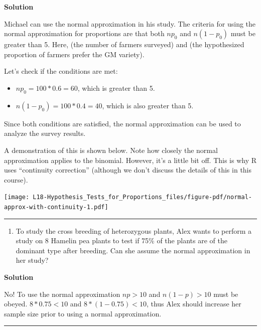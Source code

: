 \documentclass[
  letterpaper,
  DIV=11,
  numbers=noendperiod,
  oneside]{scrreprt}
\providecommand{\tightlist}{%
  \setlength{\itemsep}{0pt}\setlength{\parskip}{0pt}}\usepackage{longtable,booktabs,array}
\begin{document}
\textbf{Solution}

Michael can use the normal approximation in his study. The criteria for
using the normal approximation for proportions are that both \(np_0\)
and \(n(1 - p_0)\) must be greater than 5. Here, (the number of farmers
surveyed) and (the hypothesized proportion of farmers prefer the GM
variety).

Let's check if the conditions are met:

\begin{itemize}
\tightlist
\item
  \(np_0 = 100 * 0.6 = 60\), which is greater than 5.
\item
  \(n(1 - p_0) = 100 * 0.4 = 40\), which is also greater than 5.
\end{itemize}

Since both conditions are satisfied, the normal approximation can be
used to analyze the survey results.

A demonstration of this is shown below. Note how closely the normal
approximation applies to the binomial. However, it's a little bit off.
This is why R uses ``continuity correction'' (although we don't discuss
the details of this in this course).

\texttt{[image: L18-Hypothesis\_Tests\_for\_Proportions\_files/figure-pdf/normal-approx-with-continuity-1.pdf]}

\begin{center}\rule{0.5\linewidth}{0.5pt}\end{center}

\begin{enumerate}
\def\labelenumi{\arabic{enumi}.}
\setcounter{enumi}{1}
\tightlist
\item
  To study the cross breeding of heterozygous plants, Alex wants to
  perform a study on 8 Hamelin pea plants to test if 75\% of the plants
  are of the dominant type after breeding. Can she assume the normal
  approximation in her study?
\end{enumerate}

\textbf{Solution}

No! To use the normal approximation \(np \gt 10\) and \(n(1-p) \gt 10\)
must be obeyed. \(8*0.75\lt 10\) and \(8*(1-0.75) \lt 10\), thus Alex
should increase her sample size prior to using a normal approximation.

\begin{center}\rule{0.5\linewidth}{0.5pt}\end{center}
\end{document}
